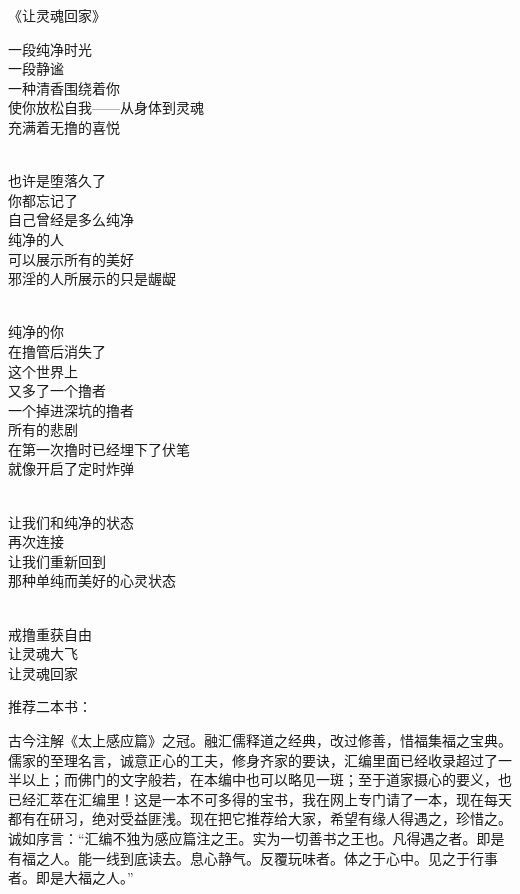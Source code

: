 \begin{center}
    《让灵魂回家》\it
    \begin{multicols}{2}
        一段纯净时光 \\ 一段静谧 \\ 一种清香围绕着你 \\ 使你放松自我——从身体到灵魂 \\ 充满着无撸的喜悦

        ~\\

        也许是堕落久了 \\ 你都忘记了 \\ 自己曾经是多么纯净 \\ 纯净的人 \\ 可以展示所有的美好 \\ 邪淫的人所展示的只是龌龊

        ~\\

        纯净的你 \\ 在撸管后消失了 \\ 这个世界上 \\ 又多了一个撸者 \\ 一个掉进深坑的撸者 \\ 所有的悲剧 \\ 在第一次撸时已经埋下了伏笔 \\ 就像开启了定时炸弹

        ~\\

        让我们和纯净的状态 \\ 再次连接 \\ 让我们重新回到 \\ 那种单纯而美好的心灵状态

        ~\\

        戒撸重获自由 \\ 让灵魂大飞 \\ 让灵魂回家
    \end{multicols}
\end{center}

推荐二本书：

\begin{book}[《感应篇汇编》]
    古今注解《太上感应篇》之冠。融汇儒释道之经典，改过修善，惜福集福之宝典。儒家的至理名言，诚意正心的工夫，修身齐家的要诀，汇编里面已经收录超过了一半以上；而佛门的文字般若，在本编中也可以略见一斑；至于道家摄心的要义，也已经汇萃在汇编里！这是一本不可多得的宝书，我在网上专门请了一本，现在每天都有在研习，绝对受益匪浅。现在把它推荐给大家，希望有缘人得遇之，珍惜之。诚如序言：“汇编不独为感应篇注之王。实为一切善书之王也。凡得遇之者。即是有福之人。能一线到底读去。息心静气。反覆玩味者。体之于心中。见之于行事者。即是大福之人。”
\end{book}

